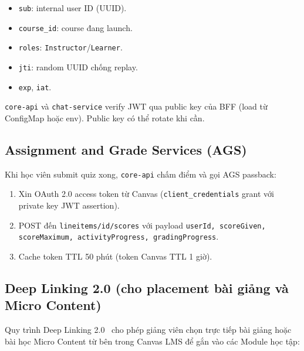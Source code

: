 \begin{itemize}
    \item \texttt{sub}: internal user ID (UUID).
    \item \texttt{course\_id}: course đang launch.
    \item \texttt{roles}: \texttt{Instructor}/\texttt{Learner}.
    \item \texttt{jti}: random UUID chống replay.
    \item \texttt{exp}, \texttt{iat}.
\end{itemize}

\texttt{core-api} và \texttt{chat-service} verify JWT qua public key
của BFF (load từ ConfigMap hoặc env). Public key có thể rotate khi
cần.

\subsection{Assignment and Grade Services (AGS)}

Khi học viên submit quiz xong, \texttt{core-api} chấm điểm và gọi AGS
passback:

\begin{enumerate}
    \item Xin OAuth 2.0 access token từ Canvas (\texttt{client\_credentials}
          grant với private key JWT assertion).
    \item POST đến \texttt{lineitems/{id}/scores} với payload
          \texttt{{userId, scoreGiven, scoreMaximum, activityProgress,
          gradingProgress}}.
    \item Cache token TTL 50 phút (token Canvas TTL 1 giờ).
\end{enumerate}

\subsection{Deep Linking 2.0 (cho placement bài giảng và Micro Content)}
\label{subsec:deep-linking-impl}

Quy trình Deep Linking 2.0~\cite{1edtech_lti_dl_2020} cho phép giảng viên chọn trực tiếp bài giảng hoặc bài học Micro Content từ bên trong Canvas LMS để gắn vào các Module học tập:

